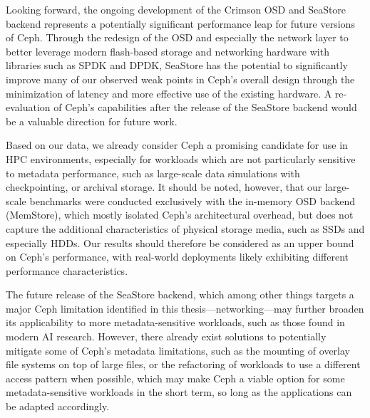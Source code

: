 Looking forward, the ongoing development of the Crimson \ac{OSD} and SeaStore backend represents a potentially significant performance leap for future versions of Ceph. Through the redesign of the \ac{OSD} and especially the network layer to better leverage modern flash-based storage and networking hardware with libraries such as \ac{SPDK} and \ac{DPDK}, SeaStore has the potential to significantly improve many of our observed weak points in Ceph's overall design through the minimization of latency and more effective use of the existing hardware. A re-evaluation of Ceph's capabilities after the release of the SeaStore backend would be a valuable direction for future work.

Based on our data, we already consider Ceph a promising candidate for use in \ac{HPC} environments, especially for workloads which are not particularly sensitive to metadata performance, such as large-scale data simulations with checkpointing, or archival storage. It should be noted, however, that our large-scale benchmarks were conducted exclusively with the in-memory \ac{OSD} backend (MemStore), which mostly isolated Ceph's architectural overhead, but does not capture the additional characteristics of physical storage media, such as \acp{SSD} and especially \acp{HDD}. Our results should therefore be considered as an upper bound on Ceph's performance, with real-world deployments likely exhibiting different performance characteristics.

The future release of the SeaStore backend, which among other things targets a major Ceph limitation identified in this thesis---networking---may further broaden its applicability to more metadata-sensitive workloads, such as those found in modern \ac{AI} research. However, there already exist solutions to potentially mitigate some of Ceph's metadata limitations, such as the mounting of overlay file systems on top of large files, or the refactoring of workloads to use a different access pattern when possible, which may make Ceph a viable option for some metadata-sensitive workloads in the short term, so long as the applications can be adapted accordingly.